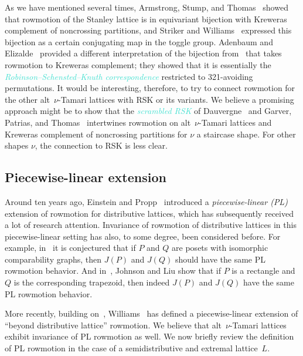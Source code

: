 \documentclass[11pt]{amsart}
\newcommand{\dfn}[1]{\textcolor{Turquoise}{\emph{#1}}}
\theoremstyle{definition}
\begin{document}
As we have mentioned several times, Armstrong, Stump, and Thomas~\cite{armstrong2013uniform} showed that rowmotion of the Stanley lattice is in equivariant bijection with Kreweras complement of noncrossing partitions, and Striker and Williams~\cite{striker2012rowmotion} expressed this bijection as a certain conjugating map in the toggle group. Adenbaum and Elizalde~\cite{adenbaum2023rowmotion} provided a different interpretation of the bijection from~\cite{armstrong2013uniform} that takes rowmotion to Kreweras complement; they showed that it is essentially the \dfn{Robinson--Schensted--Knuth correspondence} restricted to 321-avoiding permutations. It would be interesting, therefore, to try to connect rowmotion for the other alt~$\nu$-Tamari lattices with RSK or its variants. We believe a promising approach might be to show that the \dfn{scrambled RSK} of Dauvergne~\cite{dauvergne2022hidden} and Garver, Patrias, and Thomas~\cite{garver2023minuscule} intertwines rowmotion on alt~$\nu$-Tamari lattices and Kreweras complement of noncrossing partitions for $\nu$ a staircase shape. For other shapes $\nu$, the connection to RSK is less clear.

\subsection{Piecewise-linear extension}

Around ten years ago, Einstein and Propp~\cite{einstein2014piecewise,einstein2021combinatorial} introduced a \emph{piecewise-linear (PL)} extension of rowmotion for distributive lattices, which has subsequently received a lot of research attention. Invariance of rowmotion of distributive lattices in this {piecewise-linear} setting  has also, to some degree, been considered before. For example, in~\cite[Conjecture~4.38]{hopkins2022minuscule} it is conjectured that if $P$ and $Q$ are posets with isomorphic comparability graphs, then $J(P)$ and $J(Q)$ should have the same PL rowmotion behavior. And in~\cite{johnson2023trapezoid}, Johnson and Liu show that if $P$ is a rectangle and $Q$ is the corresponding trapezoid, then indeed $J(P)$ and $J(Q)$ have the same PL rowmotion behavior. 

More recently, building on~\cite{thomas2019rowmotion,thomas2019independence}, Williams~\cite{williams2020personal} has defined a piecewise-linear extension of ``beyond distributive lattice'' rowmotion. We believe that alt~$\nu$-Tamari lattices exhibit invariance of {PL rowmotion} as well. We now briefly review the definition of PL rowmotion in the case of a semidistributive and extremal lattice~$L$.
\end{document}
